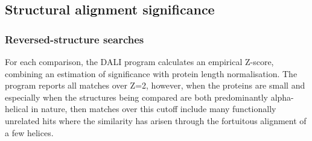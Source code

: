 % 
% 

\subsection{Structural alignment significance}

\subsubsection{Reversed-structure searches}

For each comparison, the DALI program calculates an empirical Z-score, combining an estimation of
significance with protein length normalisation.   The program reports all matches over Z=2, however,
when the proteins are small and especially when the structures being compared are both predominantly
alpha-helical in nature, then matches over this cutoff include many functionally unrelated
hits where the similarity has arisen through the fortuitous alignment of a few helices.

